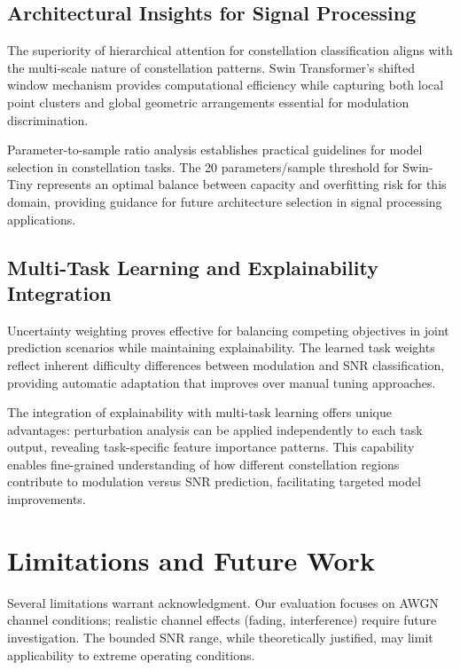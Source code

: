 \documentclass{ELSP}
\begin{document}
\subsection{Architectural Insights for Signal Processing}

The superiority of hierarchical attention for constellation classification aligns with the multi-scale nature of constellation patterns. Swin Transformer's shifted window mechanism provides computational efficiency while capturing both local point clusters and global geometric arrangements essential for modulation discrimination.

Parameter-to-sample ratio analysis establishes practical guidelines for model selection in constellation tasks. The 20 parameters/sample threshold for Swin-Tiny represents an optimal balance between capacity and overfitting risk for this domain, providing guidance for future architecture selection in signal processing applications.

\subsection{Multi-Task Learning and Explainability Integration}

Uncertainty weighting proves effective for balancing competing objectives in joint prediction scenarios while maintaining explainability. The learned task weights reflect inherent difficulty differences between modulation and SNR classification, providing automatic adaptation that improves over manual tuning approaches.

The integration of explainability with multi-task learning offers unique advantages: perturbation analysis can be applied independently to each task output, revealing task-specific feature importance patterns. This capability enables fine-grained understanding of how different constellation regions contribute to modulation versus SNR prediction, facilitating targeted model improvements.

\section{Limitations and Future Work}

Several limitations warrant acknowledgment. Our evaluation focuses on AWGN channel conditions; realistic channel effects (fading, interference) require future investigation. The bounded SNR range, while theoretically justified, may limit applicability to extreme operating conditions.
\end{document}
